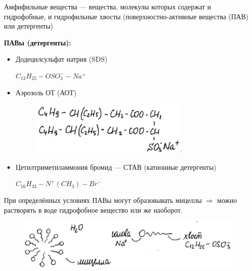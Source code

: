 \begin{lecture}
	\begin{lecSection}
	\begin{flushleft}
		\begin{definition}
		Амфифильные вещества --- вещества, молекулы которых содержат и гидрофобные, и гидрофильные хвосты (поверхностно-активные вещества (ПАВ) или детергенты)
		\end{definition}
	\par \textbf{ПАВы (детергенты):}
		\begin{itemize}
			\item Додецилсульфат натрия (SDS)
				\par $C_{12}H_{25}-OSO_3^--Na^+$
			\item Аэрозоль ОТ (АОТ)
				\begin{figure}[H]
				\begin{minipage}[h]{0.5\linewidth}
					\centering\includegraphics[width=\linewidth]{lecture_07/new_pic5}
				\end{minipage}
				\hfill
				\end{figure}
			\item Цетилтриметиламмония бромид — СТАВ (катионные детергенты)
				\par $C_{16}H_{33}-N^+ (CH_3)-Br^-$
		\end{itemize}
		\par При определённых условиях ПАВы могут образовывать мицеллы $\Rightarrow$ можно растворять в воде гидрофобное вещество или же наоборот.
			\begin{figure}[H]
			\begin{minipage}[h]{0.7\linewidth}
				\centering\includegraphics[width=\linewidth]{lecture_07/new_pic6}
			\end{minipage}
			\hfill
			\end{figure}
	

\end{flushleft}
\end{lecSection}
\end{lecture}
